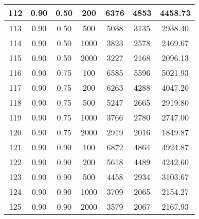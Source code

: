 \documentclass[a4paper, 12pt, unknownkeysallowed]{extreport}
\begin{document}
\begin{center}
\begin{longtable}[c]{|c|c|c|c|c|c|c|}
 112 & 0.90 & 0.50 &   200 & 6376 & 4853 & 4458.73 \\ \hline
 113 & 0.90 & 0.50 &   500 & 5038 & 3135 & 2938.40 \\ \hline
 114 & 0.90 & 0.50 &  1000 & 3823 & 2578 & 2469.67 \\ \hline
 115 & 0.90 & 0.50 &  2000 & 3227 & 2168 & 2096.13 \\ \hline
 116 & 0.90 & 0.75 &   100 & 6585 & 5596 & 5021.93 \\ \hline
 117 & 0.90 & 0.75 &   200 & 6263 & 4288 & 4047.20 \\ \hline
 118 & 0.90 & 0.75 &   500 & 5247 & 2665 & 2919.80 \\ \hline
 119 & 0.90 & 0.75 &  1000 & 3766 & 2780 & 2747.00 \\ \hline
 120 & 0.90 & 0.75 &  2000 & 2919 & 2016 & 1849.87 \\ \hline
 121 & 0.90 & 0.90 &   100 & 6872 & 4864 & 4924.87 \\ \hline
 122 & 0.90 & 0.90 &   200 & 5618 & 4489 & 4242.60 \\ \hline
 123 & 0.90 & 0.90 &   500 & 4458 & 2934 & 3103.67 \\ \hline
 124 & 0.90 & 0.90 &  1000 & 3709 & 2065 & 2154.27 \\ \hline
 125 & 0.90 & 0.90 &  2000 & 3579 & 2067 & 2167.93 \\ \hline
  \end{longtable}
\end{center}
\end{document}
